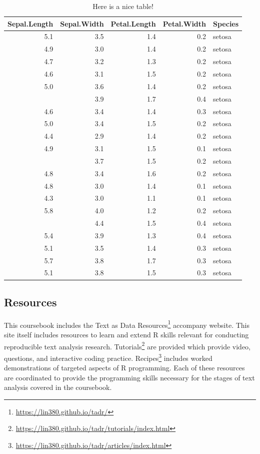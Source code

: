 \documentclass[
]{article}
\DeclareRobustCommand{\href}[2]{#2\footnote{\url{#1}}}
\begin{document}
\begin{table}

\caption{\label{tab:test-tab}Here is a nice table!}
\centering
\begin{tabular}[t]{rrrrl}
\toprule
Sepal.Length & Sepal.Width & Petal.Length & Petal.Width & Species\\
\midrule
5.1 & 3.5 & 1.4 & 0.2 & setosa\\
4.9 & 3.0 & 1.4 & 0.2 & setosa\\
4.7 & 3.2 & 1.3 & 0.2 & setosa\\
4.6 & 3.1 & 1.5 & 0.2 & setosa\\
5.0 & 3.6 & 1.4 & 0.2 & setosa\\
\addlinespace
5.4 & 3.9 & 1.7 & 0.4 & setosa\\
4.6 & 3.4 & 1.4 & 0.3 & setosa\\
5.0 & 3.4 & 1.5 & 0.2 & setosa\\
4.4 & 2.9 & 1.4 & 0.2 & setosa\\
4.9 & 3.1 & 1.5 & 0.1 & setosa\\
\addlinespace
5.4 & 3.7 & 1.5 & 0.2 & setosa\\
4.8 & 3.4 & 1.6 & 0.2 & setosa\\
4.8 & 3.0 & 1.4 & 0.1 & setosa\\
4.3 & 3.0 & 1.1 & 0.1 & setosa\\
5.8 & 4.0 & 1.2 & 0.2 & setosa\\
\addlinespace
5.7 & 4.4 & 1.5 & 0.4 & setosa\\
5.4 & 3.9 & 1.3 & 0.4 & setosa\\
5.1 & 3.5 & 1.4 & 0.3 & setosa\\
5.7 & 3.8 & 1.7 & 0.3 & setosa\\
5.1 & 3.8 & 1.5 & 0.3 & setosa\\
\bottomrule
\end{tabular}
\end{table}

\hypertarget{resources}{%
\subsection*{Resources}\label{resources}}

This coursebook includes the \href{https://lin380.github.io/tadr/}{Text as Data Resources} accompany website. This site itself includes resources to learn and extend R skills relevant for conducting reproducible text analysis research. \href{https://lin380.github.io/tadr/tutorials/index.html}{Tutorials} are provided which provide video, questions, and interactive coding practice. \href{https://lin380.github.io/tadr/articles/index.html}{Recipes} includes worked demonstrations of targeted aspects of R programming. Each of these resources are coordinated to provide the programming skills necessary for the stages of text analysis covered in the coursebook.
\end{document}
